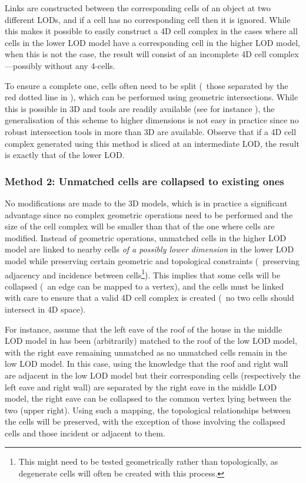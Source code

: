 Links are constructed between the corresponding cells of an object at two different LODs, and if a cell has no corresponding cell then it is ignored.
While this makes it possible to easily construct a 4D cell complex in the cases where all cells in the lower LOD model have a corresponding cell in the higher LOD model, when this is not the case, the result will consist of an incomplete 4D cell complex---possibly without any 4-cells.

To ensure a complete one, cells often need to be split (\eg\ those separated by the red dotted line in ), which can be performed using geometric intersections.
While this is possible in 3D and tools are readily available (see for instance \citet{Granados03,Hachenberger06}), the generalisation of this scheme to higher dimensions is not easy in practice since no robust intersection tools in more than 3D are available.
Observe that if a 4D cell complex generated using this method is sliced at an intermediate LOD, the result is exactly that of the lower LOD\@.


\subsubsection{Method 2: Unmatched cells are collapsed to existing ones}
\label{sss:method2}

No modifications are made to the 3D models, which is in practice a significant advantage since no complex geometric operations need to be performed and the size of the cell complex will be smaller than that of the one where cells are modified.
Instead of geometric operations, unmatched cells in the higher LOD model are linked to nearby cells \emph{of a possibly lower dimension} in the lower LOD model while preserving certain geometric and topological constraints (\eg\ preserving adjacency and incidence between cells\footnote{This might need to be tested geometrically rather than topologically, as degenerate cells will often be created with this process.}).
This implies that some cells will be collapsed (\eg\ an edge can be mapped to a vertex), and the cells must be linked with care to ensure that a valid 4D cell complex is created (\eg\ no two cells should intersect in 4D space).

For instance, assume that the left eave of the roof of the house in the middle LOD model in  has been (arbitrarily) matched to the roof of the low LOD model, with the right eave remaining unmatched as no unmatched cells remain in the low LOD model.
In this case, using the knowledge that the roof and right wall are adjacent in the low LOD model but their corresponding cells (respectively the left eave and right wall) are separated by the right eave in the middle LOD model, the right eave can be collapsed to the common vertex lying between the two (upper right).
Using such a mapping, the topological relationships between the cells will be preserved, with the exception of those involving the collapsed cells and those incident or adjacent to them.

